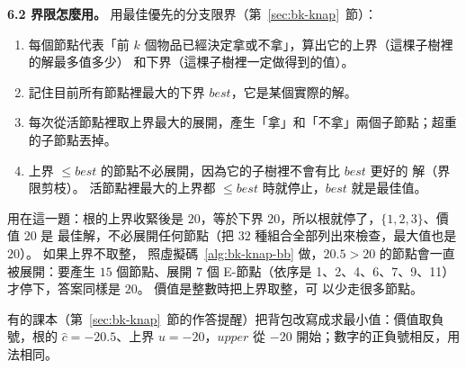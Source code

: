 \textbf{6.2 界限怎麼用。} 用最佳優先的分支限界（第~\ref{sec:bk-knap}~節）：
\begin{enumerate}
\item 每個節點代表「前 $k$ 個物品已經決定拿或不拿」，算出它的上界（這棵子樹裡的解最多值多少）
和下界（這棵子樹裡一定做得到的值）。
\item 記住目前所有節點裡最大的下界 $\mathit{best}$，它是某個實際的解。
\item 每次從活節點裡取上界最大的展開，產生「拿」和「不拿」兩個子節點；超重的子節點丟掉。
\item 上界 $\le \mathit{best}$ 的節點不必展開，因為它的子樹裡不會有比 $\mathit{best}$ 更好的
解（界限剪枝）。 活節點裡最大的上界都 $\le \mathit{best}$ 時就停止，$\mathit{best}$ 就是最佳值。
\end{enumerate}

用在這一題：根的上界收緊後是 $20$，等於下界 $20$，所以根就停了，$\{1, 2, 3\}$、價值 $20$ 是
最佳解，不必展開任何節點（把 $32$ 種組合全部列出來檢查，最大值也是 $20$）。 如果上界不取整，
照虛擬碼~\ref{alg:bk-knap-bb} 做，$20.5 > 20$ 的節點會一直被展開：要產生 $15$ 個節點、展開 $7$
個 E-節點（依序是 1、2、4、6、7、9、11）才停下，答案同樣是 $20$。 價值是整數時把上界取整，可
以少走很多節點。

有的課本（第~\ref{sec:bk-knap}~節的作答提醒）把背包改寫成求最小值：價值取負號，根的
$\hat c = -20.5$、上界 $u = -20$，$\mathit{upper}$ 從 $-20$ 開始；數字的正負號相反，用法相同。

